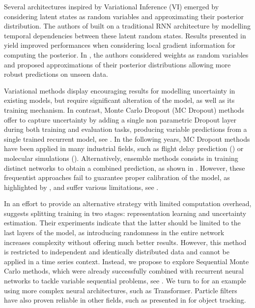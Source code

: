 \documentclass{article}
\begin{document}
Several architectures inspired by Variational Inference (VI) emerged by considering latent states as random variables and approximating their posterior distribution.
The authors of \cite{Chung2015NIPS} built on a traditional RNN architecture by modelling temporal dependencies between these latent random states.
Results presented in \cite{Fortunato2017bayesian} yield improved performances when considering local gradient information for computing the posterior.
In \cite{Blundell2015}, the authors considered weights as random variables and proposed approximations of their posterior distributions allowing more robust predictions on unseen data.

Variational methods display encouraging results for modelling uncertainty in existing models, but require significant alteration of the model, as well as its training mechanism.
In contrast, Monte Carlo Dropout (MC Dropout) methods offer to capture uncertainty by adding a single non parametric Dropout layer during both training and evaluation tasks, producing variable predictions from a single trained recurrent model, see \cite{Gal2016NIPS}.
In the following years, MC Dropout methods have been applied in many industrial fields, such as flight delay prediction (\cite{Vandal2018}) or molecular simulations (\cite{Wen2020UncertaintyQI}).
Alternatively, ensemble methods consists in training distinct networks to obtain a combined prediction, as shown in \cite{Pearce2018}.
However, these frequentist approaches fail to guarantee proper calibration of the model, as highlighted by \cite{ashukha2020pitfalls}, and suffer various limitations, see \cite{Fong2020}.

In an effort to provide an alternative strategy with limited computation overhead, \cite{Brosse2020OnLA} suggests splitting training in two stages: representation learning and uncertainty estimation.
Their experiments indicate that the latter should be limited to the last layers of the model, as introducing randomness in the entire network increases complexity without offering much better results. However, this method is restricted to independent and identically distributed data and cannot be applied in a time series context.
Instead, we propose to explore Sequential Monte Carlo methods, which were already successfully combined with recurrent neural networks to tackle variable sequential problems, see \cite{Ma2020}.
We turn to \cite{Martin2020TheMC} for an example using more complex neural architectures, such as Transformer.
Particle filters have also proven reliable in other fields, such as presented in \cite{Liu2020LSTMPF} for object tracking.
\end{document}
